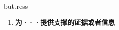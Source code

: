 
\begin{frame}
{\huge buttress}
\begin{center}
\begin{enumerate}\Large
  \item \textbf{为···提供支撑的证据或者信息}
\end{enumerate}
\end{center}
\end{frame}
